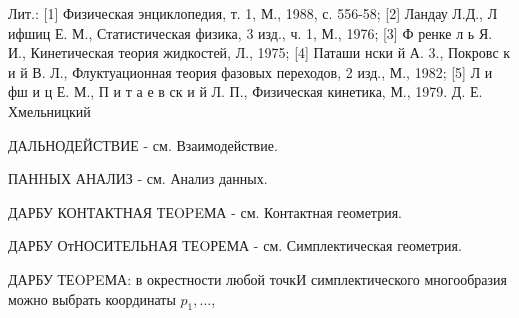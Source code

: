 \documentclass[10pt]{article}
\begin{document}
Лит.: [1] Физическая энциклопедия, т. 1, М., 1988, с. 556-58; [2] Ландау Л.Д., Л ифшиц Е. М., Статистическая физика, 3 изд., ч. 1, М., 1976; [3] Ф ренке л ь Я. И., Кинетическая теория жидкостей, Л., 1975; [4] Паташи нски й А. 3., Покровс к и й В. Л., Флуктуационная теория фазовых переходов, 2 изд., М., 1982; [5] Л и фш и ц Е. М., П и т а е в ск и й Л. П., Физическая кинетика, М., 1979. Д. Е. Хмельницкий



ДАЛЬНОДЕЙСТВИЕ - см. Взаимодействие.



ПАНHЫХ АНАЛИЗ - см. Анализ данных.



ДАРБУ КОНТАКТНАЯ ТЕOPEМА - см. Контактная геометрия.



ДАРБУ ОтНОСИТЕЛЬНАЯ ТЕOРЕМА - см. Симплектическая геометрия.



ДАРБУ ТЕOPEМА: в окрестности любой точкИ симплектического многообразия можно выбрать координаты $p_{1}, \ldots$,
\end{document}

